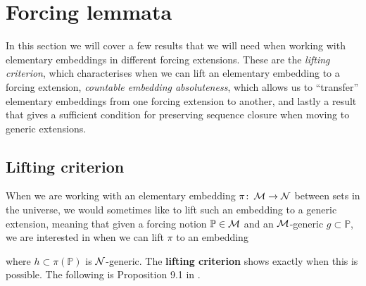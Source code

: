 \documentclass[../../main]{subfiles}
\begin{document}
\section{Forcing lemmata}
\label{prelims.forcing}

In this section we will cover a few results that we will need when working with elementary embeddings in different forcing extensions. These are the \textit{lifting criterion}, which characterises when we can lift an elementary embedding to a forcing extension, \textit{countable embedding absoluteness}, which allows us to ``transfer'' elementary embeddings from one forcing extension to another, and lastly a result that gives a sufficient condition for preserving sequence closure when moving to generic extensions.

\subsection{Lifting criterion}
When we are working with an elementary embedding $\pi\colon\operatorname{\mathcal M}\to\operatorname{\mathcal N}$ between sets in the universe, we would sometimes like to lift such an embedding to a generic extension, meaning that given a forcing notion $\mathbb P\in\operatorname{\mathcal M}$ and an $\operatorname{\mathcal M}$-generic $g\subset\mathbb P$, we are interested in when we can lift $\pi$ to an embedding
\eq{
  \pi^+\colon\M[g]\to\N[h],
}

where $h\subset\pi(\mathbb P)$ is $\operatorname{\mathcal N}$-generic. The \textbf{lifting criterion} shows exactly when this is possible. The following is Proposition 9.1 in \cite{handbook-cummings}.

\end{document}
